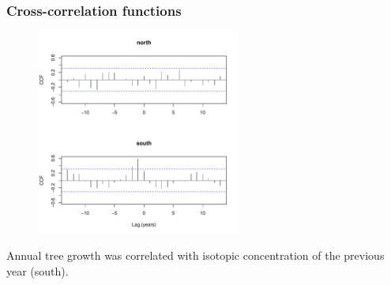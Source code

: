 \documentclass{beamer}
\begin{document}
\begin{frame}
\frametitle{Cross-correlation functions}
\begin{figure}
\includegraphics[width = 0.6\textwidth]{CCFFun}
\end{figure}
Annual tree growth was correlated with isotopic concentration of the
previous year (south).
\end{frame}
\end{document}
